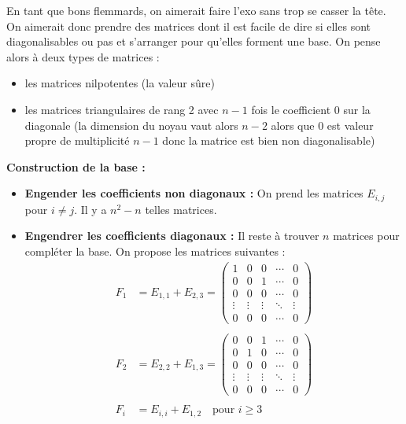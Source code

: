 \documentclass[a4paper,12pt]{article}
\begin{document}
    \begin{correctionbox}
        En tant que bons flemmards, on aimerait faire l'exo sans trop se casser la tête. On aimerait donc prendre des matrices dont il est facile de dire si elles sont diagonalisables ou pas et s'arranger pour qu'elles forment une base. On pense alors à deux types de matrices :
        \begin{itemize}
        \item les matrices nilpotentes (la valeur sûre)
        \item les matrices triangulaires de rang 2 avec \( n-1 \) fois le coefficient 0 sur la diagonale (la dimension du noyau vaut alors \( n-2 \) alors que 0 est valeur propre de multiplicité \( n-1 \) donc la matrice est bien non diagonalisable)
        \end{itemize}
        
        \vspace{0.5em}
        
        \textbf{Construction de la base :}
        
        \vspace{0.5em}
        
        \begin{itemize}
        \item \textbf{Engender les coefficients non diagonaux :} On prend les matrices \( E_{i,j} \) pour \( i \neq j \). Il y a \( n^2 - n \) telles matrices.
        
        \item \textbf{Engendrer les coefficients diagonaux :} Il reste à trouver \( n \) matrices pour compléter la base. On propose les matrices suivantes : \\
          \begin{align*}
          F_1 &= E_{1,1} + E_{2,3} = \begin{pmatrix}
          1 & 0 & 0 & \cdots & 0 \\
          0 & 0 & 1 & \cdots & 0 \\
          0 & 0 & 0 & \cdots & 0 \\
          \vdots & \vdots & \vdots & \ddots & \vdots \\
          0 & 0 & 0 & \cdots & 0
          \end{pmatrix} \\\\
          F_2 &= E_{2,2} + E_{1,3} = \begin{pmatrix}
          0 & 0 & 1 & \cdots & 0 \\
          0 & 1 & 0 & \cdots & 0 \\
          0 & 0 & 0 & \cdots & 0 \\
          \vdots & \vdots & \vdots & \ddots & \vdots \\
          0 & 0 & 0 & \cdots & 0
          \end{pmatrix} \\\\
          F_i &= E_{i,i} + E_{1,2} \quad \text{pour } i \geq 3
          \end{align*}
        \end{itemize}
        

\end{correctionbox}
\end{document}
